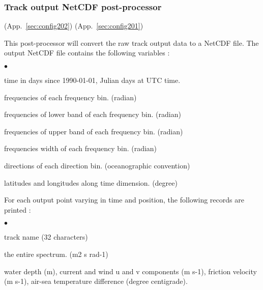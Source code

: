 \vsssub
\subsubsection{Track output NetCDF post-processor} \label{sec:ww3trnc} 
\vsssub

 (App.~\ref{sec:config202})
 (App.~\ref{sec:config201})

\vspace{\baselineskip} 
\noindent
This post-processor will convert the raw track output data to a NetCDF file. 
The output NetCDF file contains the following variables :

\begin{list}{$\bullet$}{\itemsep 0mm \parsep 0mm}
\item time in days since 1990-01-01, Julian days at UTC time.
\item frequencies of each frequency bin. (radian)
\item frequencies of lower band of each frequency bin. (radian)
\item frequencies of upper band of each frequency bin. (radian)
\item frequencies width of each frequency bin. (radian)
\item directions of each direction bin. (oceanographic convention)
\item latitudes and longitudes along time dimension. (degree)
\end{list}

\noindent
For each output point varying in time and position, the following records are printed :
\begin{list}{$\bullet$}{\itemsep 0mm \parsep 0mm}
\item track name (32 characters)
\item the entire spectrum. (m2 s rad-1)
\item water depth (m), current and wind u and v components (m s-1),
friction velocity (m s-1), air-sea temperature difference (degree
centigrade).
\end{list}

\pb
